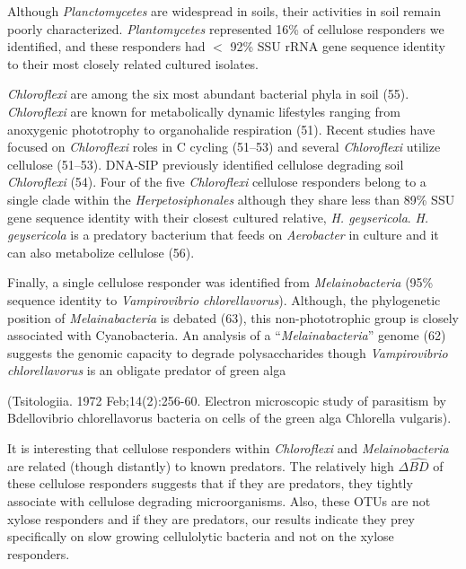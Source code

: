 Although \textit{Planctomycetes} are widespread in soils, their activities in
soil remain poorly characterized. \textit{Plantomycetes} represented 16\% of
cellulose responders we identified, and these responders had $<$ 92\% SSU rRNA
gene sequence identity to their most closely related cultured isolates.

\textit{Chloroflexi} are among the six most abundant bacterial phyla in soil
(55). \textit{Chloroflexi} are known for metabolically dynamic lifestyles
ranging from anoxygenic phototrophy to organohalide respiration (51). Recent
studies have focused on \textit{Chloroflexi} roles in C cycling (51–53) and
several \textit{Chloroflexi} utilize cellulose (51–53). DNA-SIP previously
identified cellulose degrading soil \textit{Chloroflexi} (54). Four of the five
\textit{Chloroflexi} cellulose responders belong to a single clade within the
\textit{Herpetosiphonales} although they share less than 89\% SSU gene sequence
identity with their closest cultured relative, \textit{H. geysericola}.
\textit{H. geysericola} is a predatory bacterium that feeds on
\textit{Aerobacter} in culture and it can also metabolize cellulose (56). 

Finally, a single cellulose responder was identified from
\textit{Melainobacteria} (95\% sequence identity to \textit{Vampirovibrio
chlorellavorus}). Although, the phylogenetic position of
\textit{Melainabacteria} is debated (63), this non-phototrophic group is
closely associated with Cyanobacteria. An analysis of
a ``\textit{Melainabacteria}'' genome (62) suggests the genomic capacity to
degrade polysaccharides though \textit{Vampirovibrio chlorellavorus} is an
obligate predator of green alga

(Tsitologiia. 1972 Feb;14(2):256-60. Electron microscopic study of parasitism
by Bdellovibrio chlorellavorus bacteria on cells of the green alga Chlorella
vulgaris). 

It is interesting that cellulose responders within \textit{Chloroflexi} and
\textit{Melainobacteria} are related (though distantly) to known predators. The
relatively high $\Delta\hat{BD}$ of these cellulose responders suggests that if
they are predators, they tightly associate with cellulose degrading
microorganisms. Also, these OTUs are not xylose responders and if they are
predators, our results indicate they prey specifically on slow growing
cellulolytic bacteria and not on the xylose responders. 

